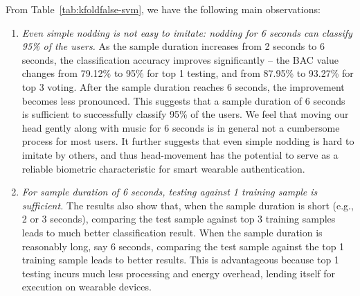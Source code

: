 From Table~\ref{tab:kfoldfalse-svm}, we have the following main observations:
\fi

\begin{enumerate}
\item \emph{Even simple nodding is not easy to imitate: nodding for 6 seconds can classify 95\% of the users.} As the sample duration increases from 2 seconds to 6 seconds, the classification accuracy improves significantly -- the BAC value changes from 79.12\% to 95\% for top 1 testing, and from 87.95\% to 93.27\% for top 3 voting. After the sample duration reaches 6 seconds, the improvement becomes less pronounced. This suggests that a sample duration of 6 seconds is sufficient to successfully classify 95\% of the users. We feel that moving our head gently along with music for 6 seconds is in general not a cumbersome process for most users. It further suggests that even simple nodding is hard to imitate by others, and thus head-movement has the potential to serve as a reliable biometric characteristic for smart wearable authentication.


\item \emph{For sample duration of 6 seconds, testing against 1 training sample is sufficient.} The results also show that, when the sample duration is short (e.g., 2 or 3 seconds), comparing the test sample against top 3 training samples leads to much better classification result. When the sample duration is reasonably long, say 6 seconds, comparing the test sample against the top 1 training sample leads to better results. This is advantageous because top 1 testing incurs much less processing and energy overhead, lending itself for execution on wearable devices.
\end{enumerate}

